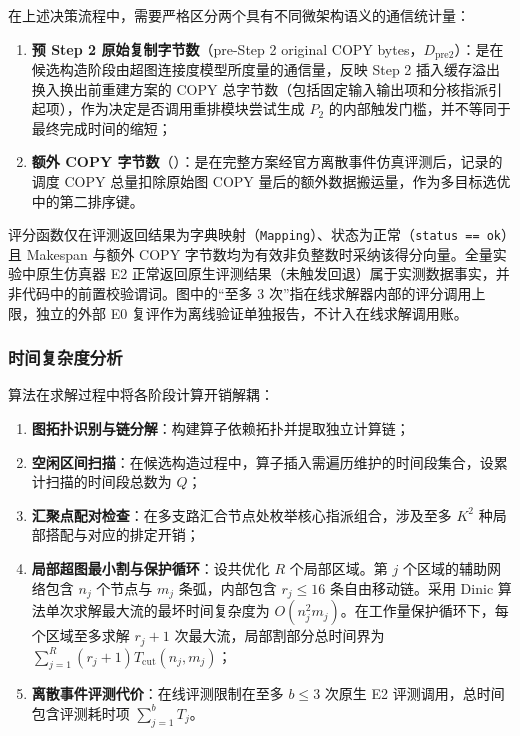 \documentclass[anonymous,withtoc]{gmcm2026}
\providecommand{\tightlist}{\setlength{\itemsep}{0pt}\setlength{\parskip}{0pt}}
\begin{document}
在上述决策流程中，需要严格区分两个具有不同微架构语义的通信统计量：

\begin{enumerate}
\def\labelenumi{\arabic{enumi}.}
\tightlist
\item
  \textbf{预 Step 2 原始复制字节数}（pre-Step 2 original COPY bytes，\(D_{\mathrm{pre2}}\)）：是在候选构造阶段由超图连接度模型所度量的通信量，反映 Step 2 插入缓存溢出换入换出前重建方案的 COPY 总字节数（包括固定输入输出项和分核指派引起项），作为决定是否调用重排模块尝试生成 \(P_2\) 的内部触发门槛，并不等同于最终完成时间的缩短；
\item
  \textbf{额外 COPY 字节数}（\texttt{}）：是在完整方案经官方离散事件仿真评测后，记录的调度 COPY 总量扣除原始图 COPY 量后的额外数据搬运量，作为多目标选优中的第二排序键。
\end{enumerate}

评分函数仅在评测返回结果为字典映射（\texttt{Mapping}）、状态为正常（\texttt{status\ ==\ \textquotesingle{}ok\textquotesingle{}}）且 Makespan 与额外 COPY 字节数均为有效非负整数时采纳该得分向量。全量实验中原生仿真器 E2 正常返回原生评测结果（未触发回退）属于实测数据事实，并非代码中的前置校验谓词。图中的``至多 3 次''指在线求解器内部的评分调用上限，独立的外部 E0 复评作为离线验证单独报告，不计入在线求解调用账。

\subsubsection{时间复杂度分析}

算法在求解过程中将各阶段计算开销解耦：

\begin{enumerate}
\def\labelenumi{\arabic{enumi}.}
\tightlist
\item
  \textbf{图拓扑识别与链分解}：构建算子依赖拓扑并提取独立计算链；
\item
  \textbf{空闲区间扫描}：在候选构造过程中，算子插入需遍历维护的时间段集合，设累计扫描的时间段总数为 \(Q\)；
\item
  \textbf{汇聚点配对检查}：在多支路汇合节点处枚举核心指派组合，涉及至多 \(K^2\) 种局部搭配与对应的排定开销；
\item
  \textbf{局部超图最小割与保护循环}：设共优化 \(R\) 个局部区域。第 \(j\) 个区域的辅助网络包含 \(n_j\) 个节点与 \(m_j\) 条弧，内部包含 \(r_j \le 16\) 条自由移动链。采用 Dinic 算法\cite{ref9}单次求解最大流的最坏时间复杂度为 \(O(n_j^2 m_j)\)。在工作量保护循环下，每个区域至多求解 \(r_j + 1\) 次最大流，局部割部分总时间界为 \(\sum_{j=1}^R (r_j + 1) T_{\mathrm{cut}}(n_j, m_j)\)；
\item
  \textbf{离散事件评测代价}：在线评测限制在至多 \(b \le 3\) 次原生 E2 评测调用，总时间包含评测耗时项 \(\sum_{j=1}^b T_j\)。
\end{enumerate}
\end{document}
